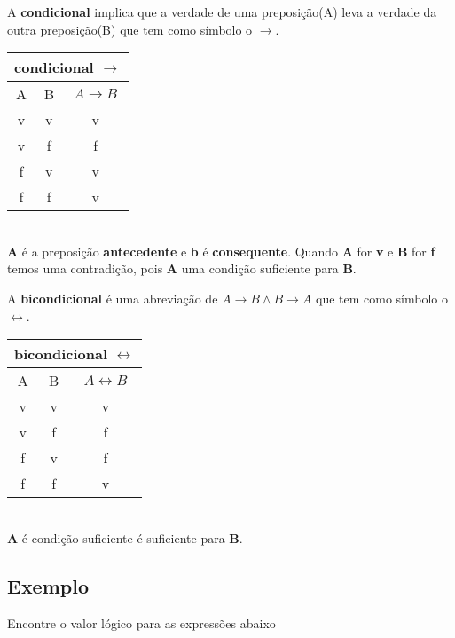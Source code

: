 \begin{multicols}{2}
	\setlength{\columnseprule}{.5pt}
A \textbf{condicional} implica que a verdade de uma preposição(A) leva a verdade da outra preposição(B) que tem como símbolo o $ \rightarrow $.\\

\begin{tabular}{|c|c|c|}
	\hline 
	\multicolumn{3}{|c|}{condicional $ \rightarrow $} \\ 
	\hline 
	A	& B & $ A \rightarrow B $ \\ 
	\hline 
	v	& v & v \\ 
	\hline 
	v	& f & f \\ 
	\hline 
	f	& v & v \\ 
	\hline 
	f	& f & v \\ 
	\hline 
\end{tabular} \\

\textbf{A} é a preposição \textbf{antecedente} e \textbf{b} é \textbf{consequente}. Quando \textbf{A} for \textbf{v} e \textbf{B} for \textbf{f} temos uma contradição, pois \textbf{A} uma condição suficiente para \textbf{B}. 

\columnbreak

A \textbf{bicondicional} é uma abreviação de $ A \rightarrow B \wedge B \rightarrow A $  que tem como símbolo o $ \leftrightarrow $.\\

\begin{tabular}{|c|c|c|}
	\hline 
	\multicolumn{3}{|c|}{bicondicional $ \leftrightarrow $} \\ 
	\hline 
	A	& B & $ A \leftrightarrow B $ \\ 
	\hline 
	v	& v & v \\ 
	\hline 
	v	& f & f \\ 
	\hline 
	f	& v & f \\ 
	\hline 
	f	& f & v \\ 
	\hline 
\end{tabular} \\

\textbf{A} é condição suficiente é suficiente para \textbf{B}.
\end{multicols}

\subsection{Exemplo}
Encontre o valor lógico para as expressões abaixo

